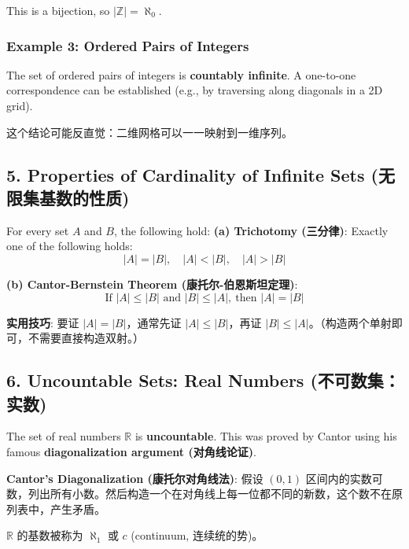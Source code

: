 \documentclass[10pt,a4paper,openany]{ctexbook}
\theoremstyle{definition}
\theoremstyle{remark}
\renewenvironment{quote}
  {\list{}{\leftmargin=1em\rightmargin=0pt\topsep=0.5pt\partopsep=0pt}\item[]}
  {\endlist}
\begin{document}
This is a bijection, so $|\mathbb{Z}| = \aleph_0$.
\subsubsection{Example 3: Ordered Pairs of Integers}

The set of ordered pairs of integers is \textbf{countably infinite}. A one-to-one correspondence can be established (e.g., by traversing along diagonals in a 2D grid).
\begin{quote}
这个结论可能反直觉：二维网格可以一一映射到一维序列。

\end{quote}
\vspace{-2pt}

\subsection{5. Properties of Cardinality of Infinite Sets (无限集基数的性质)}

For every set $A$ and $B$, the following hold:
\textbf{(a) Trichotomy (三分律)}: Exactly one of the following holds:
\[
|A| = |B|,\quad |A| < |B|,\quad |A| > |B|
\]

\textbf{(b) Cantor-Bernstein Theorem (康托尔-伯恩斯坦定理)}:
\[
\text{If } |A| \le |B| \text{ and } |B| \le |A|,\ \text{then } |A| = |B|
\]

\begin{quote}
\textbf{实用技巧}: 要证 $|A| = |B|$，通常先证 $|A| \le |B|$，再证 $|B| \le |A|$。（构造两个单射即可，不需要直接构造双射。）

\end{quote}
\vspace{-2pt}

\subsection{6. Uncountable Sets: Real Numbers (不可数集：实数)}

The set of real numbers $\mathbb{R}$ is \textbf{uncountable}. This was proved by Cantor using his famous \textbf{diagonalization argument (对角线论证)}.
\begin{quote}
\textbf{Cantor's Diagonalization (康托尔对角线法)}: 假设 $(0,1)$ 区间内的实数可数，列出所有小数。然后构造一个在对角线上每一位都不同的新数，这个数不在原列表中，产生矛盾。

$\mathbb{R}$ 的基数被称为 $\aleph_1$ 或 $c$ (continuum, 连续统的势)。

\end{quote}
\vspace{-2pt}
\end{document}
